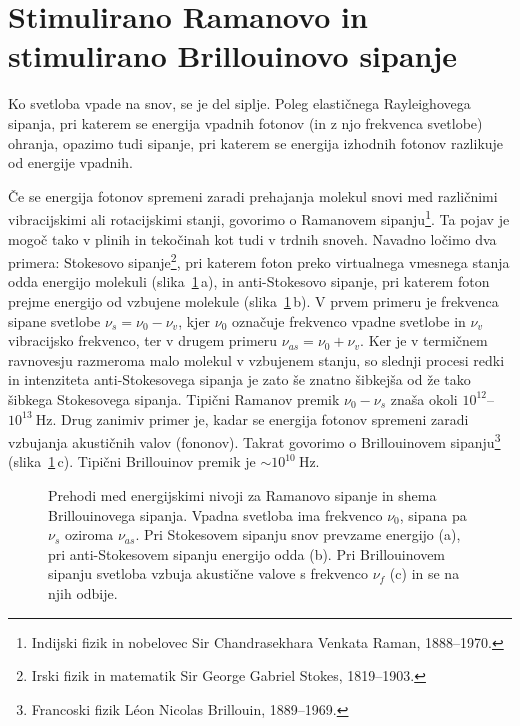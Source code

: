 \section{Stimulirano Ramanovo in stimulirano Brillouinovo sipanje}
\label{chap:SRS}
Ko svetloba vpade na snov, se je del siplje. Poleg elastičnega Rayleighovega sipanja,
pri katerem se energija vpadnih fotonov (in z njo frekvenca svetlobe) ohranja, opazimo 
tudi sipanje, pri katerem se energija izhodnih fotonov razlikuje od energije 
vpadnih. 

Če se energija fotonov spremeni zaradi prehajanja molekul snovi med različnimi
vibracijskimi ali rotacijskimi stanji, govorimo o Ramanovem
sipanju\footnote{Indijski fizik in nobelovec Sir Chandrasekhara Venkata Raman, 1888--1970.}. 
Ta pojav je mogoč tako v plinih in tekočinah kot tudi v trdnih snoveh. Navadno 
ločimo dva primera: Stokesovo sipanje\footnote{Irski fizik in matematik Sir George Gabriel
Stokes, 1819--1903.}, pri katerem foton preko virtualnega vmesnega stanja 
odda energijo molekuli (slika~\ref{08_Raman}\,a),
in anti-Stokesovo sipanje,
pri katerem foton prejme energijo od vzbujene molekule (slika~\ref{08_Raman}\,b).
V prvem primeru je frekvenca
sipane svetlobe $\nu_s=\nu_0-\nu_v$, kjer $\nu_0$ označuje frekvenco vpadne
svetlobe in $\nu_v$ vibracijsko frekvenco, ter v drugem primeru $\nu_{as}=\nu_0+\nu_v$.
Ker je v termičnem ravnovesju razmeroma malo molekul v vzbujenem stanju, so slednji 
procesi redki in intenziteta anti-Stokesovega sipanja je zato 
še znatno šibkejša od že tako šibkega Stokesovega sipanja. Tipični Ramanov premik 
$\nu_0-\nu_s$ znaša okoli $10^{12}$--$10^{13}~\si{\hertz}$.
Drug zanimiv primer je, kadar se energija fotonov spremeni zaradi 
vzbujanja akustičnih valov (fononov). Takrat govorimo o Brillouinovem 
sipanju\footnote{Francoski fizik L\'eon Nicolas Brillouin, 1889--1969.} (slika~\ref{08_Raman}\,c).
Tipični Brillouinov premik je $\sim 10^{10}~\si{\hertz}$. 

\begin{figure}[h]
\centering
\def\svgwidth{140truemm} 

\caption{Prehodi med energijskimi nivoji za Ramanovo sipanje in shema Brillouinovega sipanja. Vpadna 
svetloba ima frekvenco $\nu_0$, sipana pa $\nu_s$ oziroma $\nu_{as}$. Pri Stokesovem sipanju 
snov prevzame energijo (a), pri anti-Stokesovem sipanju energijo odda (b).
Pri Brillouinovem sipanju svetloba vzbuja akustične valove s frekvenco $\nu_f$ (c) in se na njih odbije.}
\label{08_Raman}
\end{figure}

